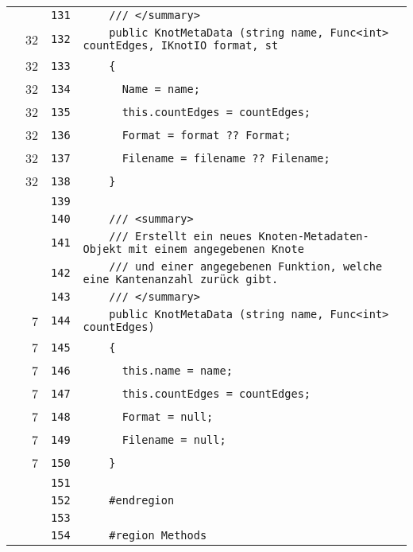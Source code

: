 \documentclass[a4paper,10pt]{article}
\begin{document}
\begin{longtable}[l]{lrrl}
\cellcolor{gray} &  & \verb~131~ & \verb~    /// </summary>~\\
\cellcolor{green} & 32 & \verb~132~ & \verb~    public KnotMetaData (string name, Func<int> countEdges, IKnotIO format, st~\\
\cellcolor{green} & 32 & \verb~133~ & \verb~    {~\\
\cellcolor{green} & 32 & \verb~134~ & \verb~      Name = name;~\\
\cellcolor{green} & 32 & \verb~135~ & \verb~      this.countEdges = countEdges;~\\
\cellcolor{green} & 32 & \verb~136~ & \verb~      Format = format ?? Format;~\\
\cellcolor{green} & 32 & \verb~137~ & \verb~      Filename = filename ?? Filename;~\\
\cellcolor{green} & 32 & \verb~138~ & \verb~    }~\\
\cellcolor{gray} &  & \verb~139~ & \verb~~\\
\cellcolor{gray} &  & \verb~140~ & \verb~    /// <summary>~\\
\cellcolor{gray} &  & \verb~141~ & \verb~    /// Erstellt ein neues Knoten-Metadaten-Objekt mit einem angegebenen Knote~\\
\cellcolor{gray} &  & \verb~142~ & \verb~    /// und einer angegebenen Funktion, welche eine Kantenanzahl zurück gibt.~\\
\cellcolor{gray} &  & \verb~143~ & \verb~    /// </summary>~\\
\cellcolor{green} & 7 & \verb~144~ & \verb~    public KnotMetaData (string name, Func<int> countEdges)~\\
\cellcolor{green} & 7 & \verb~145~ & \verb~    {~\\
\cellcolor{green} & 7 & \verb~146~ & \verb~      this.name = name;~\\
\cellcolor{green} & 7 & \verb~147~ & \verb~      this.countEdges = countEdges;~\\
\cellcolor{green} & 7 & \verb~148~ & \verb~      Format = null;~\\
\cellcolor{green} & 7 & \verb~149~ & \verb~      Filename = null;~\\
\cellcolor{green} & 7 & \verb~150~ & \verb~    }~\\
\cellcolor{gray} &  & \verb~151~ & \verb~~\\
\cellcolor{gray} &  & \verb~152~ & \verb~    #endregion~\\
\cellcolor{gray} &  & \verb~153~ & \verb~~\\
\cellcolor{gray} &  & \verb~154~ & \verb~    #region Methods~\\

\end{longtable}
\end{document}

